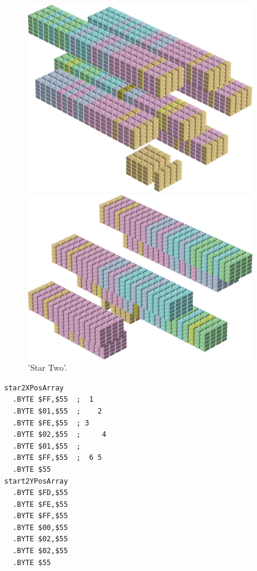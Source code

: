 \begin{minipage}[b]{0.48\linewidth}
\begin{figure}[H]
    \centering
    \begin{adjustbox}{width=5cm,margin=0cm 0cm}
      \includegraphics[width=10cm]{src/colorspace_patterns/pattern7-45.png}%
    \end{adjustbox}
    \begin{adjustbox}{width=5cm,margin=0cm 0cm}
      \includegraphics[width=10cm]{src/colorspace_patterns/pattern7-225.png}%
    \end{adjustbox}
\caption{'Star Two'.}
\end{figure}
\end{minipage}
\begin{minipage}[b]{0.48\linewidth}
\begin{lrbox}{\mybox}%
\begin{lstlisting}[basicstyle=\ttfamily\tiny,escapechar=\%]
star2XPosArray
  .BYTE $FF,$55  ;  1   
  .BYTE $01,$55  ;    2 
  .BYTE $FE,$55  ; 3    
  .BYTE $02,$55  ;     4
  .BYTE $01,$55  ;      
  .BYTE $FF,$55  ;  6 5 
  .BYTE $55
start2YPosArray
  .BYTE $FD,$55
  .BYTE $FE,$55
  .BYTE $FF,$55
  .BYTE $00,$55
  .BYTE $02,$55
  .BYTE $02,$55
  .BYTE $55
\end{lstlisting}
\end{lrbox}%
\scalebox{0.8}{\usebox{\mybox}}

\end{minipage}
